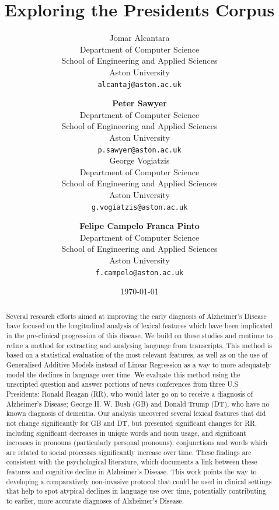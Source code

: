 \documentclass[12pt]{article}
\title{Exploring the Presidents Corpus}
\author{
	Jomar Alcantara \\
	Department of Computer Science\\
	School of Engineering and Applied Sciences\\
	Aston University\\
	\texttt{alcantaj@aston.ac.uk} \\
		\and
	\textbf{Peter Sawyer} \\
	Department of Computer Science\\
	School of Engineering and Applied Sciences\\
	Aston University\\
	\texttt{p.sawyer@aston.ac.uk} \\
		\AND
	George Vogiatzis\\
	Department of Computer Science\\
	School of Engineering and Applied Sciences\\
	Aston University \\
	\texttt{g.vogiatzis@aston.ac.uk} \\
		\and
	\textbf{Felipe Campelo Franca Pinto}\\
	Department of Computer Science\\
	School of Engineering and Applied Sciences\\
	Aston University\\
	\texttt{f.campelo@aston.ac.uk}
}
\date{\today}
\begin{document}
\maketitle

\bigskip
\begin{abstract}
Several research efforts aimed at improving the early diagnosis of Alzheimer's Disease have focused on the longitudinal analysis of lexical features which have been implicated in the pre-clinical progression of this disease. We build on these studies and continue to refine a method for extracting and analysing language from transcripts. This method is based on a statistical evaluation of the most relevant features, as well as on the use of Generalised Additive Models instead of Linear Regression as a way to more adequately model the declines in language over time. We evaluate this method using the unscripted question and answer portions of news conferences from three U.S Presidents: Ronald Reagan (RR), who would later go on to receive a diagnosis of Alzheimer's Disease; George H. W. Bush (GB) and Donald Trump (DT), who have no known diagnosis of dementia. Our analysis uncovered several lexical features that did not change significantly for GB and DT, but presented significant changes for RR, including significant decreases in unique words and noun usage, and significant increases in pronouns (particularly personal pronouns), conjunctions and words which are related to social processes significantly increase over time. These findings are consistent with the psychological literature, which documents a link between these features and cognitive decline in Alzheimer's Disease. This work points the way to developing a comparatively non-invasive protocol that could be used in clinical settings that help to spot atypical declines in language use over time, potentially contributing to earlier, more accurate diagnoses of Alzheimer's Disease.


\end{abstract}
\end{document}

